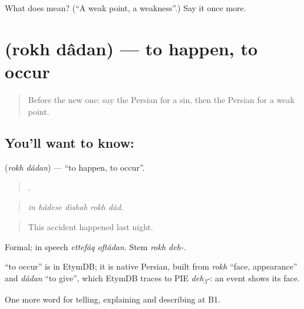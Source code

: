 \begin{tcolorbox}[breakable,colback=teal!4,colframe=teal!35!black,title={Before you move on}]
What does   mean? (\textquotedblleft{}A weak point, a weakness\textquotedblright{}.) Say it once more.
\end{tcolorbox}
\section[\texorpdfstring{\fa{رخ} \fa{دادن} (rokh dâdan)}{رخ دادن (rokh dâdan)}]{  (rokh dâdan) — to happen, to occur}

\label{lesson:FA-C376-rokh-dadan}



\begin{quote}
Before the new one: say the Persian for a sin, then the Persian for a weak point.
\end{quote}

\subsection*{You'll want to know:  }
\textbf{ } (\emph{rokh dâdan}) — \textquotedblleft{}to happen, to occur\textquotedblright{}.

\begin{quote}
    .
\end{quote}

\begin{quote}
\emph{in hâdese dishab rokh dâd.}
\end{quote}

\begin{quote}
This accident happened last night.
\end{quote}

Formal; in speech \emph{ettefâq oftâdan}. Stem \emph{rokh deh-}.

\begin{cousinweb}
\textbf{ } \textquotedblleft{}to occur\textquotedblright{} is in EtymDB; it is native Persian, built from \emph{rokh} \textquotedblleft{}face, appearance\textquotedblright{} and \emph{dâdan} \textquotedblleft{}to give\textquotedblright{}, which EtymDB traces to PIE \emph{deh\textsubscript{3}-}: an event shows its face.
\end{cousinweb}

\begin{grammarlens}[title={What you've built}]
One more word for telling, explaining and describing at B1.
\end{grammarlens}

